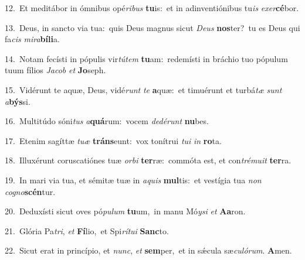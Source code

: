 {\numbfont\textcolor{\numbcolor}{12.}}~Et meditábor in ómnibus opé\-\textit{ri}\-\textit{bus} \textbf{tu}\-is:~\star et in adinventiónibus tu\textit{is} \textit{ex}\-\textit{er}\textbf{cé}bor.\par
{\numbfont\textcolor{\numbcolor}{13.}}~Deus, in sancto via tua:~\dagger quis Deus magnus sicut \textit{De}\-\textit{us} \textbf{nos}\-ter?~\star tu es Deus qui fa\textit{cis} \textit{mi}\-\textit{ra}\textbf{bí}\textbf{li}a.\par
{\numbfont\textcolor{\numbcolor}{14.}}~Notam fecísti in pópulis vir\-\textit{tú}\-\textit{tem} \textbf{tu}\-am:~\star redemísti in bráchio tuo pópulum tuum fílios \textit{Ja}\-\textit{cob} \textit{et} \textbf{Jo}\-seph.\par
{\numbfont\textcolor{\numbcolor}{15.}}~Vidérunt te aquæ, Deus, vidé\textit{runt} \textit{te} \textbf{a}\-quæ:~\star et timuérunt et turbá\textit{tæ} \textit{sunt} \textit{a}\-\textbf{býs}si.\par
{\numbfont\textcolor{\numbcolor}{16.}}~Multitúdo sóni\textit{tus} \textit{a}\-\textbf{quá}rum:~\star vocem \textit{de}\-\textit{dé}\textit{runt} \textbf{nu}\-bes.\par
{\numbfont\textcolor{\numbcolor}{17.}}~Etenim sagíttæ \textit{tu}\-\textit{æ} \textbf{tráns}\-eunt:~\star vox tonítrui \textit{tu}\-\textit{i} \textit{in} \textbf{ro}\-ta.\par
{\numbfont\textcolor{\numbcolor}{18.}}~Illuxérunt coruscatiónes tuæ \textit{or}\-\textit{bi} \textbf{ter}\-ræ:~\star commóta est, et con\-\textit{tré}\-\textit{mu}\textit{it} \textbf{ter}\-ra.\par
{\numbfont\textcolor{\numbcolor}{19.}}~In mari via tua, et sémitæ tuæ in \textit{a}\-\textit{quis} \textbf{mul}\-tis:~\star et vestígia tua \textit{non} \textit{co}\-\textit{gno}\textbf{scén}tur.\par
{\numbfont\textcolor{\numbcolor}{20.}}~Deduxísti sicut oves pó\-\textit{pu}\-\textit{lum} \textbf{tu}\-um,~\star in manu Mó\-\textit{y}\-\textit{si} \textit{et} \textbf{A}\-\textbf{a}ron.\par
{\numbfont\textcolor{\numbcolor}{21.}}~Glória Pa\-\textit{tri}\-, \textit{et} \textbf{Fí}\-lio,~\star et Spi\-\textit{rí}\-\textit{tu}\textit{i} \textbf{Sanc}\-to.\par
{\numbfont\textcolor{\numbcolor}{22.}}~Sicut erat in princípio, et \textit{nunc}\-, \textit{et} \textbf{sem}\-per,~\star et in sǽcula sæ\-\textit{cu}\-\textit{ló}\textit{rum}. \textbf{A}\-men.\par
